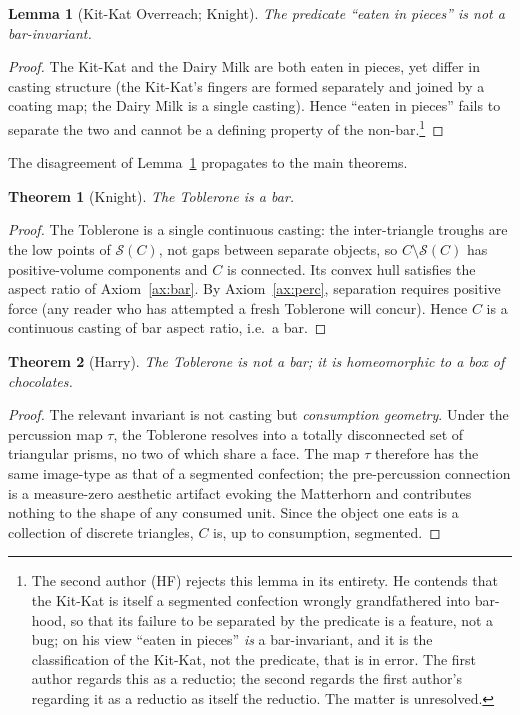 \documentclass[11pt]{article}
\theoremstyle{plain}
\newtheorem{theorem}{Theorem}
\newtheorem{lemma}{Lemma}
\theoremstyle{definition}
\theoremstyle{remark}
\newcommand{\score}{\mathcal{S}}
\begin{document}
\begin{lemma}[Kit-Kat Overreach; Knight]\label{lem:kitkat}
The predicate ``eaten in pieces'' is not a bar-invariant.
\end{lemma}
\begin{proof}
The Kit-Kat and the Dairy Milk are both eaten in pieces, yet differ in
casting structure (the Kit-Kat's fingers are formed separately and joined by
a coating map; the Dairy Milk is a single casting). Hence ``eaten in
pieces'' fails to separate the two and cannot be a defining property of the
non-bar.\footnote{The second author (HF) rejects this lemma in its
entirety. He contends that the Kit-Kat is itself a segmented confection
wrongly grandfathered into bar-hood, so that its failure to be separated by
the predicate is a feature, not a bug; on his view ``eaten in pieces''
\emph{is} a bar-invariant, and it is the classification of the Kit-Kat, not
the predicate, that is in error. The first author regards this as a reductio;
the second regards the first author's regarding it as a reductio as itself
the reductio. The matter is unresolved.}
\end{proof}

The disagreement of Lemma~\ref{lem:kitkat} propagates to the main theorems.

\begin{theorem}[Knight]\label{thm:knight}
The Toblerone is a bar.
\end{theorem}
\begin{proof}
The Toblerone is a single continuous casting: the inter-triangle troughs are
the low points of \(\score(C)\), not gaps between separate objects, so
\(C \setminus \score(C)\) has positive-volume components and \(C\) is
connected. Its convex hull satisfies the aspect ratio of
Axiom~\ref{ax:bar}. By Axiom~\ref{ax:perc}, separation requires positive
force (any reader who has attempted a fresh Toblerone will concur). Hence
\(C\) is a continuous casting of bar aspect ratio, i.e.\ a bar. \qedhere
\end{proof}

\begin{theorem}[Harry]\label{thm:harry}
The Toblerone is not a bar; it is homeomorphic to a box of chocolates.
\end{theorem}
\begin{proof}
The relevant invariant is not casting but \emph{consumption geometry}. Under
the percussion map \(\tau\), the Toblerone resolves into a totally
disconnected set of triangular prisms, no two of which share a face. The
map \(\tau\) therefore has the same image-type as that of a segmented
confection; the pre-percussion connection is a measure-zero aesthetic
artifact evoking the Matterhorn and contributes nothing to the shape of any
consumed unit. Since the object one eats is a collection of discrete
triangles, \(C\) is, up to consumption, segmented. \qedhere
\end{proof}
\end{document}
